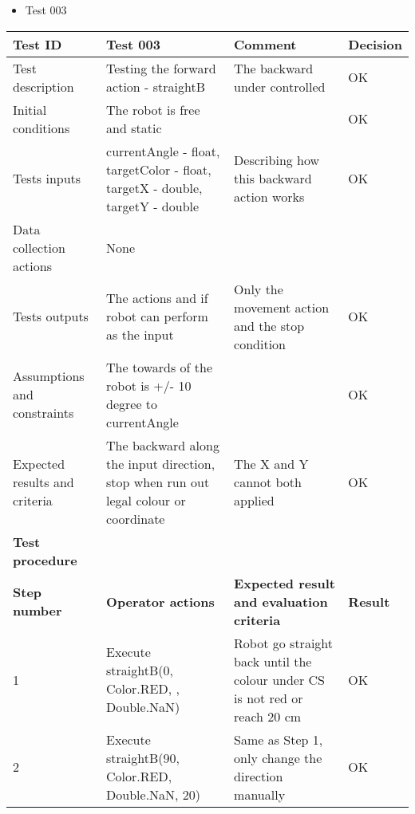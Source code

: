 \documentclass[11pt, a4paper]{article}
\begin{document}
\begin{itemize}
\item {Test 003}\\
\end{itemize}

\begin{tabular} 
	 {|p{4cm}|p{4.5cm}|p{4.5cm}|p{1.5cm}|}
\hline
\textbf{Test ID} & \textbf{Test 003} & \textbf{Comment} & \textbf{Decision}\\
\hline
{Test description} & {Testing the forward \newline action - straightB} & {The backward under controlled} & {OK}\\
\hline
{Initial conditions} & {The robot is free and static} & {} & {OK}\\
\hline
{Tests inputs} & {currentAngle - float, \newline targetColor - float, \newline targetX - double, \newline targetY - double} & {Describing how this backward action works} & {OK}\\
\hline
{Data collection actions} & {None} & {} & {}\\
\hline
{Tests outputs} & {The actions and if robot can \newline perform as the input} & {Only the movement action and the stop condition} & {OK}\\
\hline
{Assumptions and constraints} & {The towards of the robot is \newline +/- 10 degree to currentAngle} & {} & {OK}\\
\hline
{Expected results and criteria} & {The backward along the input direction, stop when run out \newline legal colour or coordinate} & {The X and Y cannot both \newline applied} & {OK}\\
\hline
\textbf{Test procedure} & \textbf{} & \textbf{} & \textbf{}\\
\hline
\textbf{Step number} & \textbf{Operator actions} & \textbf{Expected result and \newline evaluation criteria} & \textbf{Result}\\
\hline
{1} & {Execute \newline straightB(0, Color.RED, \newline 20, Double.NaN)} & {Robot go straight back until the colour under CS is not red or reach 20 cm} & {OK}\\
\hline
{2} & {Execute \newline straightB(90, Color.RED, \newline Double.NaN, 20)} & {Same as Step 1, only change the direction manually} & {OK}\\
\hline
\end{tabular}
\newpage
\end{document}
